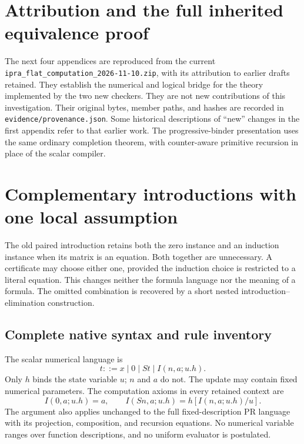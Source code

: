 \documentclass[11pt,letterpaper]{article}
\theoremstyle{definition}\newtheorem{definition}[theorem]{Definition}
\theoremstyle{remark}\newtheorem{remark}[theorem]{Remark}
\newcommand{\file}[1]{{\small\nolinkurl{#1}}}
\begin{document}
\section*{Attribution and the full inherited equivalence proof}
The next four appendices are reproduced from the current
\file{ipra_flat_computation_2026-11-10.zip}, with its attribution
to earlier drafts retained. They establish the numerical and logical
bridge for the theory implemented by the two new checkers. They are
not new contributions of this investigation. Their original bytes,
member paths, and hashes are recorded in
\file{evidence/provenance.json}. Some historical descriptions of
``new'' changes in the first appendix refer to that earlier work.
The progressive-binder presentation uses the same ordinary completion
theorem, with counter-aware primitive recursion in place of the scalar
compiler.

\section{Complementary introductions with one local assumption}
\label{sec:choice-introduction}

The old paired introduction retains both the zero instance and an
induction instance when its matrix is an equation. Both together are
unnecessary. A certificate may choose either one, provided the induction
choice is restricted to a literal equation. This changes neither the
formula language nor the meaning of a formula. The omitted combination
is recovered by a short nested introduction--elimination construction.

\subsection{Complete native syntax and rule inventory}

The scalar numerical language is
\[
 t::=x\mid0\mid St\mid I(n,a;u.h).
\]
Only $h$ binds the state variable $u$; $n$ and $a$ do not.
The update may contain fixed numerical parameters. The computation
axioms in every retained context are
\[
 I(0,a;u.h)=a,\qquad
 I(Sn,a;u.h)=h[I(n,a;u.h)/u].
 \tag{I0, IS}\label{eq:choice-computations}
\]
The argument also applies unchanged to the full fixed-description PR
language with its projection, composition, and recursion equations.
No numerical variable ranges over function descriptions, and no uniform
evaluator is postulated.
\end{document}
